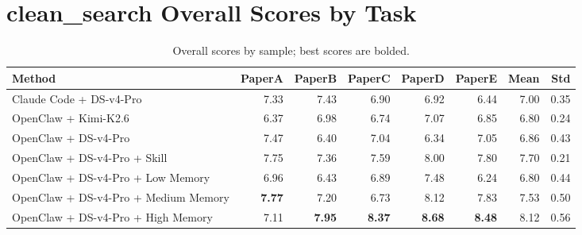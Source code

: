 \documentclass[10pt]{article}
\begin{document}
\section*{clean\_search Overall Scores by Task}
\begin{table}[t]
\centering
\small
\begin{tabular}{lrrrrrrr}
\toprule
Method & PaperA & PaperB & PaperC & PaperD & PaperE & Mean & Std \\
\midrule
Claude Code + DS-v4-Pro & 7.33 & 7.43 & 6.90 & 6.92 & 6.44 & 7.00 & 0.35 \\
OpenClaw + Kimi-K2.6 & 6.37 & 6.98 & 6.74 & 7.07 & 6.85 & 6.80 & 0.24 \\
OpenClaw + DS-v4-Pro & 7.47 & 6.40 & 7.04 & 6.34 & 7.05 & 6.86 & 0.43 \\
OpenClaw + DS-v4-Pro + Skill & 7.75 & 7.36 & 7.59 & 8.00 & 7.80 & 7.70 & 0.21 \\
OpenClaw + DS-v4-Pro + Low Memory & 6.96 & 6.43 & 6.89 & 7.48 & 6.24 & 6.80 & 0.44 \\
OpenClaw + DS-v4-Pro + Medium Memory & \textbf{7.77} & 7.20 & 6.73 & 8.12 & 7.83 & 7.53 & 0.50 \\
OpenClaw + DS-v4-Pro + High Memory & 7.11 & \textbf{7.95} & \textbf{8.37} & \textbf{8.68} & \textbf{8.48} & 8.12 & 0.56 \\
\bottomrule
\end{tabular}
\caption{Overall scores by sample; best scores are bolded.}
\label{tab:clean-search-overall-by-task}
\end{table}
\end{document}
